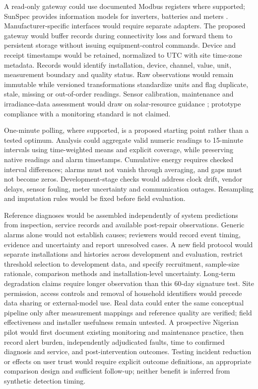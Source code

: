 \documentclass[11pt,a4paper]{article}
\begin{document}
A read-only gateway could use documented Modbus registers where supported; SunSpec provides information models for inverters, batteries and meters \cite{sunspec2018}. Manufacturer-specific interfaces would require separate adapters. The proposed gateway would buffer records during connectivity loss and forward them to persistent storage without issuing equipment-control commands. Device and receipt timestamps would be retained, normalized to UTC with site time-zone metadata. Records would identify installation, device, channel, value, unit, measurement boundary and quality status. Raw observations would remain immutable while versioned transformations standardize units and flag duplicate, stale, missing or out-of-order readings. Sensor calibration, maintenance and irradiance-data assessment would draw on solar-resource guidance \cite{sengupta2024}; prototype compliance with a monitoring standard is not claimed.


One-minute polling, where supported, is a proposed starting point rather than a tested optimum. Analysis could aggregate valid numeric readings to 15-minute intervals using time-weighted means and explicit coverage, while preserving native readings and alarm timestamps. Cumulative energy requires checked interval differences; alarms must not vanish through averaging, and gaps must not become zeros. Development-stage checks would address clock drift, vendor delays, sensor fouling, meter uncertainty and communication outages. Resampling and imputation rules would be fixed before field evaluation.


Reference diagnoses would be assembled independently of system predictions from inspection, service records and available post-repair observations. Generic alarms alone would not establish causes; reviewers would record event timing, evidence and uncertainty and report unresolved cases. A new field protocol would separate installations and histories across development and evaluation, restrict threshold selection to development data, and specify recruitment, sample-size rationale, comparison methods and installation-level uncertainty. Long-term degradation claims require longer observation than this 60-day signature test. Site permission, access controls and removal of household identifiers would precede data sharing or external-model use. Real data could enter the same conceptual pipeline only after measurement mappings and reference quality are verified; field effectiveness and installer usefulness remain untested. A prospective Nigerian pilot would first document existing monitoring and maintenance practice, then record alert burden, independently adjudicated faults, time to confirmed diagnosis and service, and post-intervention outcomes. Testing incident reduction or effects on user trust would require explicit outcome definitions, an appropriate comparison design and sufficient follow-up; neither benefit is inferred from synthetic detection timing.
\end{document}
